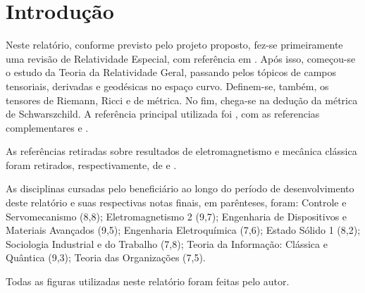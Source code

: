 \chapter*{Introdução}
Neste relatório, conforme previsto pelo projeto proposto, fez-se primeiramente uma revisão de Relatividade Especial, com referência em \cite{dray2012geometry}. Após isso, começou-se o estudo da Teoria da Relatividade Geral, passando pelos tópicos de campos tensoriais, derivadas e geodésicas no espaço curvo. Definem-se, também, os tensores de Riemann, Ricci e de métrica. No fim, chega-se na dedução da métrica de Schwarszchild. A referência principal utilizada foi \cite{foster2010short}, com as referencias complementares \cite{hartle2003gravity} e \cite{schutz2009first}. 

As referências retiradas sobre resultados de eletromagnetismo e mecânica clássica foram retirados, respectivamente, de \cite{griffiths2005introduction} e \cite{nussenzveig2013curso}. %

As disciplinas cursadas pelo beneficiário ao longo do período de desenvolvimento deste relatório e suas respectivas notas finais, em parênteses, foram: Controle e Servomecanismo (8,8); Eletromagnetismo 2 (9,7); Engenharia de Dispositivos e Materiais Avançados (9,5); Engenharia Eletroquímica (7,6); Estado Sólido 1 (8,2); Sociologia Industrial e do Trabalho (7,8); Teoria da Informação: Clássica e Quântica (9,3); Teoria das Organizações (7,5).

Todas as figuras utilizadas neste relatório foram feitas pelo autor.


